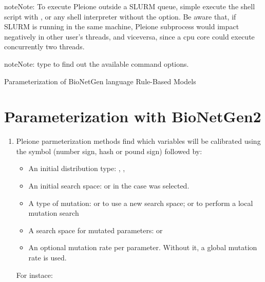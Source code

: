 \documentclass[letterpaper,10pt,english]{sphinxmanual}
\begin{document}
\begin{sphinxadmonition}{note}{Note:}
 To execute Pleione outside a SLURM
queue, simple execute the shell script with ,  or any shell
interpreter without the  option. Be aware that, if SLURM is
running in the same machine, Pleione subprocess would impact negatively in
other user’s threads, and viceversa, since a cpu core could execute
concurrently two threads.
\end{sphinxadmonition}

\begin{sphinxadmonition}{note}{Note:}
 type  to find out the
available command options.
\end{sphinxadmonition}

Parameterization of BioNetGen language Rule-Based Models


\section{Parameterization with BioNetGen2}
\label{\detokenize{engines/bng2:parameterization-with-bionetgen2}}\label{\detokenize{engines/bng2::doc}}\begin{enumerate}
\def\theenumi{\arabic{enumi}}
\def\labelenumi{\theenumi .}
\makeatletter\def\p@enumii{\p@enumi \theenumi .}\makeatother
\item {} 

Pleione parmeterization methods find which variables will be calibrated using
the symbol \sphinxcode{\sphinxupquote{\#}} (number sign, hash or pound sign) followed by:
\begin{itemize}
\item {} 
An initial distribution type: , , 

\item {} 
An initial search space:  or 
in the case  was selected.

\item {} 
A type of mutation:  or  to use a new search
space; or  to perform a local mutation search

\item {} 
A search space for mutated parameters:  or

\item {} 
An optional mutation rate per parameter. Without it, a global mutation
rate is used.

\end{itemize}

For instace:

\end{enumerate}
\end{document}
